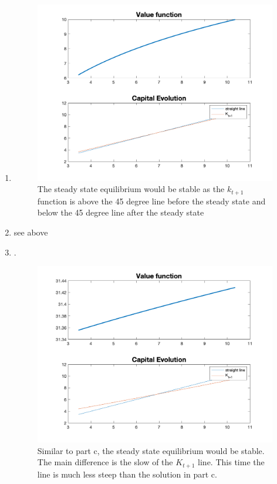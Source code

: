 \begin{enumerate}
   \item 
   \begin{figure}[H]
       \centering
       \includegraphics[width = .5\linewidth]{HW3/pics/HW3_Q2_figure.png}
       \caption{The steady state equilibrium would be stable as the $k_{t+1}$ function is above the 45 degree line before the steady state and below the 45 degree line after the steady state}
       \label{fig:HW3_2c}
   \end{figure}
   \item see above
   \item .
   \begin{figure}[H]
       \centering
       \includegraphics[width = .5\linewidth]{HW3/pics/HW3_Q2_e_figure.png}
       \caption{Similar to part c, the steady state equilibrium would be stable. The main difference is the slow of the $K_{t+1}$ line. This time the line is much less steep than the solution in part c.}
       \label{fig:HW3_2e}
   \end{figure}
\end{enumerate}